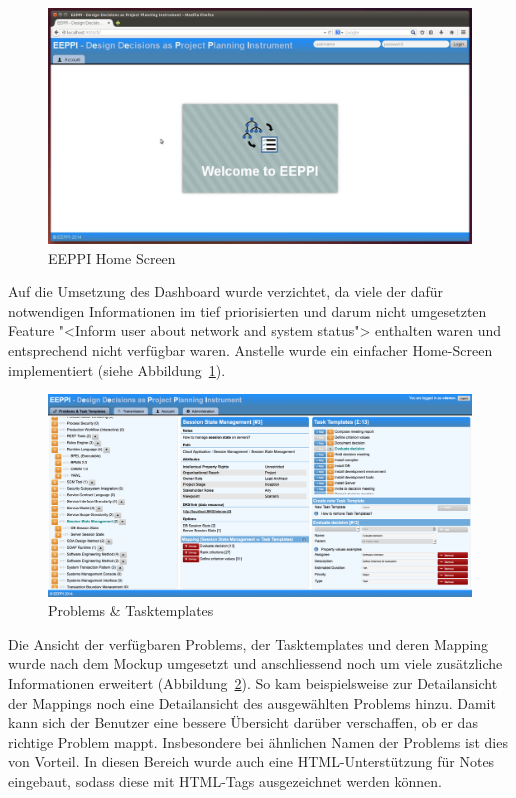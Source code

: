 		\begin{figure}[H]
			\centering
			\includegraphics[width=\linewidth]{tutorial/img/eeppiHomeScreen.jpg}
			\caption{EEPPI Home Screen}
			\label{fig:eeppiHomeScreen}
		\end{figure}	
		
		Auf die Umsetzung des Dashboard wurde verzichtet, da viele der dafür notwendigen Informationen im tief priorisierten und darum nicht umgesetzten Feature "<Inform user about network and system status"> enthalten waren und entsprechend nicht verfügbar waren.
		Anstelle wurde ein einfacher Home-Screen implementiert (siehe Abbildung~\ref{fig:eeppiHomeScreen}).
		
		
		\begin{figure}[H]
			\centering
			\includegraphics[width=\linewidth]{tutorial/img/eeppiDecisionsAndTaskTemplates.png}
			\caption{Problems \& Tasktemplates}
			\label{fig:eeppiDecisionsAndTaskTemplates}
		\end{figure}	
		
		Die Ansicht der verfügbaren Problems, der Tasktemplates und deren Mapping wurde nach dem Mockup umgesetzt und anschliessend noch um viele zusätzliche Informationen erweitert (Abbildung~\ref{fig:eeppiDecisionsAndTaskTemplates}).
		So kam beispielsweise zur Detailansicht der Mappings noch eine Detailansicht des ausgewählten Problems hinzu.
		Damit kann sich der Benutzer eine bessere Übersicht darüber verschaffen,
		ob er das richtige Problem mappt.
		Insbesondere bei ähnlichen Namen der Problems ist dies von Vorteil.
		In diesen Bereich wurde auch eine HTML-Unterstützung für Notes eingebaut, 
		sodass diese mit HTML-Tags ausgezeichnet werden können.
		
